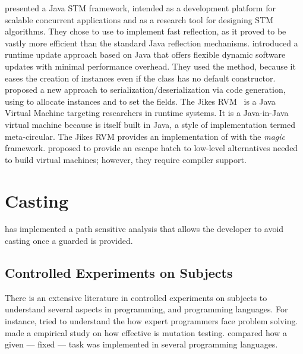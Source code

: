 \cite{korlandNoninvasiveConcurrencyJava2010} presented a Java STM framework, intended as a development platform for scalable concurrent applications and as a research tool for designing STM algorithms.
They chose to use \smu{} to implement fast reflection, as it proved to be vastly more efficient than the standard Java reflection mechanisms.
\cite{pukallFlexibleDynamicSoftware} introduced a runtime update approach based on Java that offers flexible dynamic software updates with minimal performance overhead.
They used the  method, because it eases the creation of instances even if the class has no default constructor.
\cite{gligoricCoDeSeFastDeserialization2011} proposed a new approach to serialization/deserialization via code generation, using \smu{} to allocate instances and to set the fields.
The Jikes RVM~\cite{alpernJikesResearchVirtual2005} is a Java Virtual Machine targeting researchers in runtime systems.
It is a Java-in-Java virtual machine because is itself built in Java, a style of implementation termed meta-circular.
The Jikes RVM provides an implementation of \smu{} with the \emph{magic} framework.
\cite{framptonDemystifyingMagicHighlevel2009} proposed  to provide an escape hatch to low-level alternatives needed to build virtual machines; however, they require compiler support.

\section{Casting}
\label{sec:lr:casting}

\cite{wintherGuardedTypePromotion2011} has implemented a path sensitive analysis that allows the developer to avoid casting once a guarded  is provided.


\subsection*{Controlled Experiments on Subjects}
\label{sec:lr:experiments}

There is an extensive literature \perse{} in controlled experiments on subjects to understand several aspects in programming, and programming languages.
For instance, \cite{solowayEmpiricalStudiesProgramming1984} tried to understand the how expert programmers face problem solving.
\cite{buddTheoreticalEmpiricalStudies1980} made a empirical study on how effective is mutation testing.
\cite{precheltEmpiricalComparisonSeven2000} compared how a given --- fixed --- task was implemented in several programming languages.

